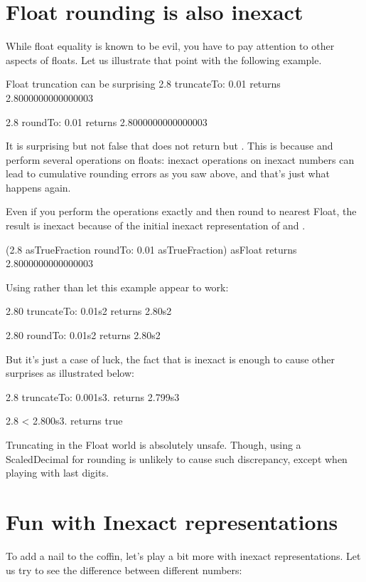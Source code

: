 \documentclass[a4paper,10pt,twoside]{book}
\begin{document}
\section{Float rounding is also inexact}
While float equality is known to be evil, you have to pay attention to other aspects of floats. Let us illustrate that point with the following example.

\begin{code}{Float truncation can be surprising}
2.8 truncateTo: 0.01
	returns 2.8000000000000003

2.8 roundTo: 0.01
	returns 2.8000000000000003
\end{code}

It is surprising but not false that  does not return  but . This is because  and  perform several operations on floats: inexact operations on inexact numbers can lead to cumulative rounding errors as you saw above, and that's just what happens again.

Even if you perform the operations exactly and then round to nearest Float, the result is inexact because of the initial inexact representation of   and  . 
\begin{code}{}
(2.8 asTrueFraction roundTo: 0.01 asTrueFraction) asFloat
	returns 2.8000000000000003
\end{code}

Using  rather than   let this example appear to work:
\begin{code}{}
2.80 truncateTo: 0.01s2
	returns  2.80s2
	
2.80 roundTo: 0.01s2
	returns  2.80s2
\end{code}

But it's just a case of luck, the fact that  is inexact is enough to cause other surprises as illustrated below:
\begin{code}{}
2.8 truncateTo: 0.001s3.
	returns 2.799s3
	
2.8 < 2.800s3.
	returns true
\end{code}

Truncating in the Float world is absolutely unsafe. Though, using a ScaledDecimal for rounding is unlikely to cause such discrepancy, except when playing with last digits.



\section{Fun with Inexact representations}
To add a nail to the coffin, let's play a bit more with inexact representations. Let us try to see the difference between different numbers: 
\end{document}
